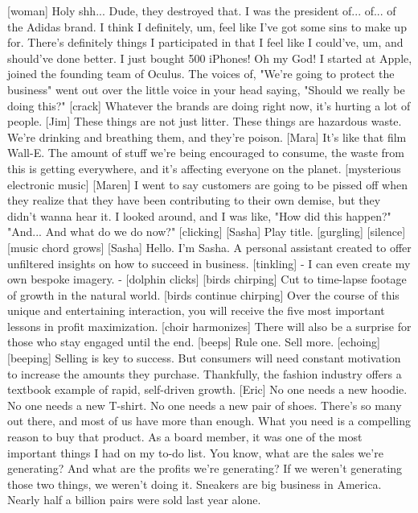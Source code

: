 \documentclass[a4paper]{article}
\begin{document}
	[woman] Holy shh...
	Dude, they destroyed that.
	I was the president of... of... of the Adidas brand.
	I think I definitely, um, feel like I've got some sins to make up for.
	There's definitely things I participated in
	that I feel like I could've, um, and should've done better.
	I just bought 500 iPhones!
	Oh my God!
	I started at Apple, joined the founding team of Oculus.
	The voices of, "We're going to protect the business"
	went out over the little voice in your head saying,
	"Should we really be doing this?"
	[crack]
	Whatever the brands are doing right now,
	it's hurting a lot of people.
	[Jim] These things are not just litter.
	These things are hazardous waste.
	We're drinking and breathing them, and they're poison.
	[Mara] It's like that film Wall-E.
	The amount of stuff we're being encouraged to consume,
	the waste from this is getting everywhere,
	and it's affecting everyone on the planet.
	[mysterious electronic music]
	[Maren] I went to say customers are going to be
	pissed off when they realize that they have been
	contributing to their own demise,
	but they didn't wanna hear it.
	I looked around, and I was like, "How did this happen?"
	"And... And what do we do now?"
	[clicking]
	[Sasha] Play title.
	[gurgling]
	[silence]
	[music chord grows]
	[Sasha] Hello.
	I'm Sasha.
	A personal assistant created to offer
	unfiltered insights on how to succeed in business.
	[tinkling]
	- I can even create my own bespoke imagery. - [dolphin clicks]
	[birds chirping]
	Cut to time-lapse footage of growth in the natural world.
	[birds continue chirping]
	Over the course of this unique and entertaining interaction,
	you will receive the five most important lessons in profit maximization.
	[choir harmonizes]
	There will also be a surprise for those who stay engaged until the end.
	[beeps]
	Rule one.
	Sell more. [echoing]
	[beeping]
	Selling is key to success.
	But consumers will need constant motivation
	to increase the amounts they purchase.
	Thankfully, the fashion industry offers a textbook example of rapid,
	self-driven growth.
	[Eric] No one needs a new hoodie.
	No one needs a new T-shirt.
	No one needs a new pair of shoes.
	There's so many out there, and most of us have more than enough.
	What you need is a compelling reason to buy that product.
	As a board member, it was one of the most important things I had on my to-do list.
	You know, what are the sales we're generating?
	And what are the profits we're generating?
	If we weren't generating those two things, we weren't doing it.
	Sneakers are big business in America.
	Nearly half a billion pairs were sold last year alone.
\end{document}
